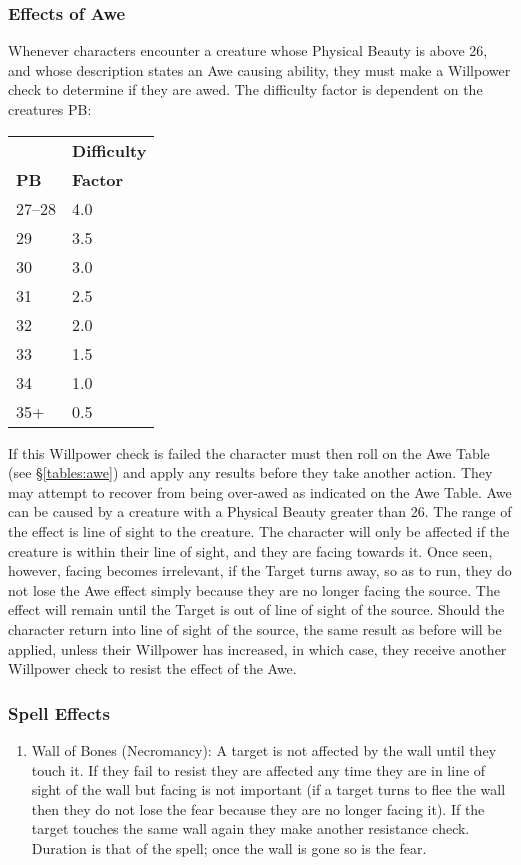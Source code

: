 \begin{multicols}{3}
\subsubsection{Effects of Awe}

Whenever characters encounter a creature whose Physical Beauty is
above 26, and whose description states an Awe causing ability, they
must make a Willpower check to determine if they are awed. The
difficulty factor is dependent on the creatures PB:

\begin{tabular}{ll}
		& \textbf{Difficulty}\\
\textbf{PB}	& \textbf{Factor} \\
27--28		& 4.0 \\
29		& 3.5 \\
30		& 3.0 \\
31		& 2.5 \\
32		& 2.0 \\
33		& 1.5 \\
34		& 1.0 \\
35+		& 0.5 \\
\end{tabular}

If this Willpower check is failed the character must then roll on the
Awe Table (see \S\ref{tables:awe}) and apply any results before they
take another action.  They may attempt to recover from being over-awed
as indicated on the Awe Table.  Awe can be caused by a creature with a
Physical Beauty greater than 26. The range of the effect is line of
sight to the creature.  The character will only be affected if the
creature is within their line of sight, and they are facing towards
it.  Once seen, however, facing becomes irrelevant, \ie if the
Target turns away, so as to run, they do not lose the Awe effect
simply because they are no longer facing the source.  The effect will
remain until the Target is out of line of sight of the source.  Should
the character return into line of sight of the source, the same result
as before will be applied, unless their Willpower has increased, in
which case, they receive another Willpower check to resist the effect
of the Awe.

\subsubsection{Spell Effects}

\begin{enumerate}
\item
{}
Wall of Bones (Necromancy): A target is not affected by the wall until
they touch it.  If they fail to resist they are affected any time they
are in line of sight of the wall but facing is not important (if a
target turns to flee the wall then they do not lose the fear because
they are no longer facing it).  If the target touches the same wall
again they make another resistance check.  Duration is that of the
spell; once the wall is gone so is the fear.


\end{enumerate}
\end{multicols}
